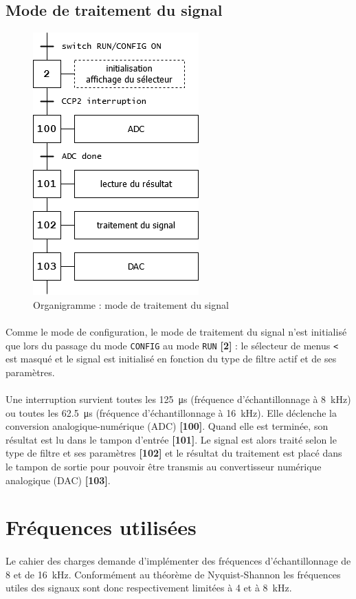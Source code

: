 \documentclass{article}
\begin{document}
    \subsection{Mode de traitement du signal}
    \begin{figure}[H]
        \centering
        \includegraphics[width=.2\textwidth]{./images/orga_run.png}
        \caption{Organigramme : mode de traitement du signal}
    \end{figure}

    \paragraph{}
    Comme le mode de configuration, le mode de traitement du signal n'est initialisé que lors du passage du mode \texttt{CONFIG} au mode \texttt{RUN} \textbf{[2]} : le sélecteur de menus \texttt{<} est masqué et le signal est initialisé en fonction du type de filtre actif et de ses paramètres.

    \paragraph{}
    Une interruption survient toutes les \SI{125}{\micro\second} (fréquence d'échantillonnage à \SI{8}{\kilo\hertz}) ou toutes les \SI{62,5}{\micro\second} (fréquence d'échantillonnage à \SI{16}{\kilo\hertz}). Elle déclenche la conversion analogique-numérique (ADC) \textbf{[100]}. Quand elle est terminée, son résultat est lu dans le tampon d'entrée \textbf{[101]}. Le signal est alors traité selon le type de filtre et ses paramètres \textbf{[102]} et le résultat du traitement est placé dans le tampon de sortie pour pouvoir être transmis au convertisseur numérique analogique (DAC) \textbf{[103]}.



    \section{Fréquences utilisées}
    \paragraph{}
    Le cahier des charges demande d'implémenter des fréquences d'échantillonnage de 8 et de \SI{16}{\kilo\hertz}. Conformément au théorème de Nyquist-Shannon les fréquences utiles des signaux sont donc respectivement limitées à 4 et à \SI{8}{\kilo\hertz}.
\end{document}
